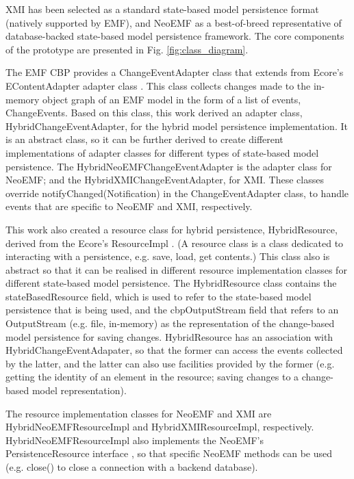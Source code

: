XMI has been selected as a standard state-based model persistence format (natively supported by EMF), and NeoEMF as a best-of-breed representative of database-backed state-based model persistence framework. The core components of the prototype are presented in Fig. \ref{fig:class_diagram}.

The EMF CBP provides a \textsf{ChangeEventAdapter} class \cite{DBLP:conf/models/YohannisKP17} that extends from Ecore’s \textsf{EContentAdapter} adapter class \cite{eclipse2018eContentAdapter}.
This class collects changes made to the in-memory object graph of an EMF model in the form of a list of events, \textsf{ChangeEvents}. Based on this class, this work derived an adapter class, \textsf{HybridChangeEventAdapter}, for the hybrid model persistence implementation. It is an abstract class, so it can be further derived to create different implementations of adapter classes for different types of state-based model persistence. The \textsf{HybridNeoEMFChangeEventAdapter} is the adapter class for NeoEMF; and the \textsf{HybridXMIChangeEventAdapter}, for XMI. These classes override \textsf{notifyChanged}(\textsf{Notification}) in the \textsf{ChangeEventAdapter} class, to handle events that are specific to NeoEMF and XMI, respectively.

This work also created a resource class for hybrid persistence, \textsf{HybridResource}, derived from the Ecore’s \textsf{ResourceImpl} \cite{eclipse2018resourceImpl}. (A resource class is a class dedicated to interacting with a persistence, e.g. save, load, get contents.) This class also is abstract so that it can be realised in different resource implementation classes for different state-based model persistence. The \textsf{HybridResource} class contains the \textsf{stateBasedResource} field, which is used to refer to the state-based model persistence that is being used, and the \textsf{cbpOutputStream} field that refers to an \textsf{OutputStream} (e.g. file, in-memory) as the representation of the change-based model persistence for saving changes. \textsf{HybridResource} has an association with \textsf{HybridChangeEventAdapater}, so that the former can access the events collected by the latter, and the latter can also use facilities provided by the former (e.g. getting the identity of an element in the resource; saving changes to a change-based model representation).

The resource implementation classes for NeoEMF and XMI are \textsf{HybridNeoEMFResourceImpl} and \textsf{HybridXMIResourceImpl}, respectively. \textsf{HybridNeoEMFResourceImpl} also implements the NeoEMF’s \textsf{PersistenceResource} interface \cite{atlanmod2018persistentResource}, so that specific NeoEMF methods can be used (e.g. \textsf{close}() to close a connection with a backend database).


